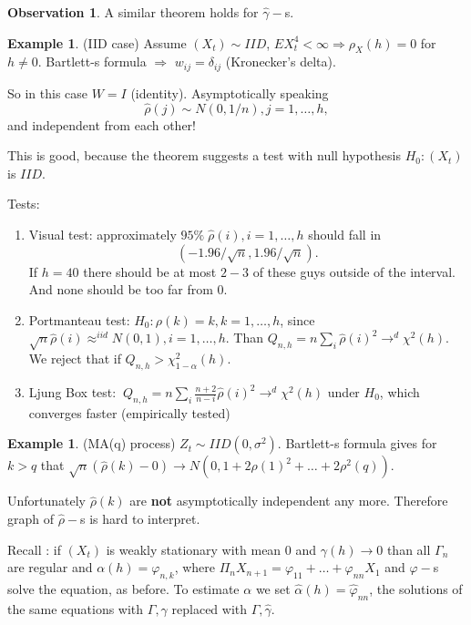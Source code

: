 \documentclass[12pt,a4paper, notitlepage]{book}
\theoremstyle{definition} %
\newtheorem{example}[definition]{Example}
\newtheorem{observation}[definition]{Observation}
\theoremstyle{plain} %
\begin{document}
\begin{observation}
A similar theorem holds for $\hat{\gamma}-$s. 
\end{observation}


\begin{example}(IID case)
Assume $(X_t) \sim IID$, $EX_t^4 < \infty \Rightarrow \rho_X(h) = 0$ for $h \neq 0$. Bartlett-s formula $\Rightarrow$
$w_{ij} = \delta_{ij}$ (Kronecker's delta).

So in this case $W = I$ (identity). Asymptotically speaking 
\[ \hat{\rho}(j) \sim N(0, 1/n), j=1, \dots, h , \]
 and independent from each other! 
\end{example}

This is good, because the theorem suggests a test with null hypothesis $H_0: (X_t)$ is $ IID$.

Tests:
\begin{enumerate}
\item Visual test: approximately $95\%\; \hat{\rho}(i), i = 1, \dots, h$ should fall in 
\[  (-1.96/\sqrt{n},1.96/\sqrt{n}). \]
 If $h = 40$ there should be at most $2-3$ of these guys outside of the interval. And none should be too far from $0$.
\item Portmanteau test: $H_0: \rho(k) = k, k = 1, \dots, h$, since $\sqrt{n}\hat{\rho}(i) \approx^{iid} N(0,1), i = 1, \dots, h$. Than $Q_{n,h} = n \sum_i \hat{\rho}(i)^2 \rightarrow^d \chi^2(h)$. We reject that if $Q_{n,h} > \chi^2_{1-\alpha}(h)$.
\item Ljung Box test: $~Q_{n, h} = n \sum_i \frac{n+2}{n-i}\hat{\rho}(i)^2 \rightarrow^d \chi^2(h)$ under $H_0$, which converges faster (empirically tested)
\end{enumerate}

\begin{example} (MA(q) process)
$Z_t \sim IID(0, \sigma^2)$. Bartlett-s formula gives for $k > q$ that 
$\sqrt{n} (\hat{\rho}(k) - 0) \rightarrow N(0, 1 + 2\rho(1)^2 + \dots + 2\rho^2(q))$.

Unfortunately $\hat{\rho}(k)$ are {\bf not} asymptotically independent any more. Therefore graph of $\hat{\rho}-$s is hard to interpret.
\end{example}

Recall : if $(X_t)$ is weakly stationary with mean $0$ and $\gamma(h) \rightarrow 0$ than all $\Gamma_n$ are regular and 
$\alpha(h) = \varphi_{n,k}$, where $\Pi_{n} X_{n+1} = \varphi_{11} + \dots + \varphi_{n n}X_1$ and $\varphi -$s solve the equation, as before.
To estimate $\alpha$ we set $\hat{\alpha}(h) = \hat{\varphi}_{n n}$, the solutions of the same equations with $\Gamma, \gamma$ replaced with $\hat{\Gamma}, \hat{\gamma}$. 
\end{document}
